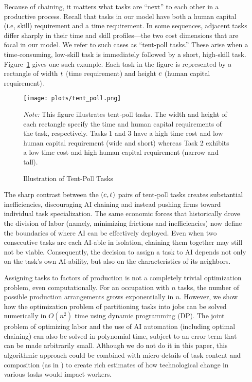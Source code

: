 \documentclass{article}
\theoremstyle{plain}
\theoremstyle{plain}
\begin{document}
Because of chaining, it matters what tasks are ``next'' to each other in a productive process.
Recall that tasks in our model have both a human capital (i.e, skill) requirement and a time requirement.
In some sequences, adjacent tasks differ sharply in their time and skill profiles---the two cost dimensions that are focal in our model.
We refer to such cases as ``tent‐poll tasks.''
These arise when a time‐consuming, low‐skill task is immediately followed by a short, high‐skill task.
Figure~\ref{fig:tent_poll} gives one such example.
Each task in the figure is represented by a rectangle of width $t_{}$ (time requirement) and height $c_{}$ (human capital requirement).
\begin{figure}[h!]
  \caption{Illustration of Tent‐Poll Tasks} 
  \label{fig:tent_poll}
  \begin{center}
    \texttt{[image: plots/tent\_poll.png]}
  \end{center}
  \begin{footnotesize}
    \emph{Note:} This figure illustrates tent‐poll tasks.  
    The width and height of each rectangle specify the time and human capital requirements of the task, respectively.
    Tasks 1 and 3 have a high time cost and low human capital requirement (wide and short) whereas Task 2 exhibits a low time cost and high human capital requirement (narrow and tall).  
  \end{footnotesize}
\end{figure}
The sharp contrast between the $(c_{}, t_{})$ pairs of tent-poll tasks creates substantial inefficiencies, discouraging AI chaining and instead pushing firms toward individual task specialization.
The same economic forces that historically drove the division of labor (namely, minimizing frictions and inefficiencies) now define the boundaries of where AI can be effectively deployed.
Even when two consecutive tasks are each AI‐able in isolation, chaining them together may still not be viable.
Consequently, the decision to assign a task to AI depends not only on the task's own AI-ability, but also on the characteristics of its neighbors.

Assigning tasks to factors of production is not a completely trivial optimization problem, even computationally.
For an occupation with $n$ tasks, the number of possible production arrangements grows exponentially in $n$. 
However, we show how the optimization problem of partitioning tasks into jobs can be solved numerically in $O(n^2)$ time using dynamic programming (DP).  The joint problem of optimizing labor and the use of AI automation (including optimal chaining) can also be solved in polynomial time, subject to an error term that can be made arbitrarily small.
Although we do not do it in this paper, this algorithmic approach could be combined with micro-details of task content and composition (as in \cite{frey2017future, felten2021occupational, eloundou2023gpts}) to create rich estimates of how technological change in various tasks would impact workers.
\end{document}
